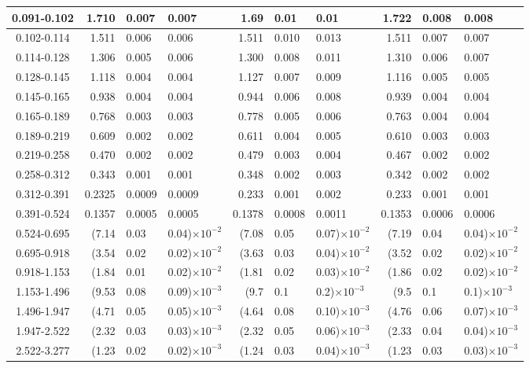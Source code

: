 \begin{table}[!htbp]
{\begin{tabular}{ | c | r@{$\pm$}l@{$\pm$}l | r@{$\pm$}l@{$\pm$}l |  r@{$\pm$}l@{$\pm$}l | }
0.091-0.102 & 1.710&0.007&0.007 & 1.69&0.01&0.01 & 1.722&0.008&0.008 \\ \hline
0.102-0.114 & 1.511&0.006&0.006 & 1.511&0.010&0.013 & 1.511&0.007&0.007 \\ \hline
0.114-0.128 & 1.306&0.005&0.006 & 1.300&0.008&0.011 & 1.310&0.006&0.007 \\ \hline
0.128-0.145 & 1.118&0.004&0.004 & 1.127&0.007&0.009 & 1.116&0.005&0.005 \\ \hline
0.145-0.165 & 0.938&0.004&0.004 & 0.944&0.006&0.008 & 0.939&0.004&0.004 \\ \hline
0.165-0.189 & 0.768&0.003&0.003 & 0.778&0.005&0.006 & 0.763&0.004&0.004 \\ \hline
0.189-0.219 & 0.609&0.002&0.002 & 0.611&0.004&0.005 & 0.610&0.003&0.003 \\ \hline
0.219-0.258 & 0.470&0.002&0.002 & 0.479&0.003&0.004 & 0.467&0.002&0.002 \\ \hline
0.258-0.312 & 0.343&0.001&0.001 & 0.348&0.002&0.003 & 0.342&0.002&0.002 \\ \hline
0.312-0.391 & 0.2325&0.0009&0.0009 & 0.233&0.001&0.002 & 0.233&0.001&0.001 \\ \hline
0.391-0.524 & 0.1357&0.0005&0.0005 & 0.1378&0.0008&0.0011 & 0.1353&0.0006&0.0006 \\ \hline
0.524-0.695 & (7.14&0.03&0.04)$\times 10^{-2}$ & (7.08&0.05&0.07)$\times 10^{-2}$ & (7.19&0.04&0.04)$\times 10^{-2}$ \\ \hline
0.695-0.918 & (3.54&0.02&0.02)$\times 10^{-2}$ & (3.63&0.03&0.04)$\times 10^{-2}$ & (3.52&0.02&0.02)$\times 10^{-2}$ \\ \hline
0.918-1.153 & (1.84&0.01&0.02)$\times 10^{-2}$ & (1.81&0.02&0.03)$\times 10^{-2}$ & (1.86&0.02&0.02)$\times 10^{-2}$ \\ \hline
1.153-1.496 & (9.53&0.08&0.09)$\times 10^{-3}$ & (9.7&0.1&0.2)$\times 10^{-3}$ & (9.5&0.1&0.1)$\times 10^{-3}$ \\ \hline
1.496-1.947 & (4.71&0.05&0.05)$\times 10^{-3}$ & (4.64&0.08&0.10)$\times 10^{-3}$ & (4.76&0.06&0.07)$\times 10^{-3}$ \\ \hline
1.947-2.522 & (2.32&0.03&0.03)$\times 10^{-3}$ & (2.32&0.05&0.06)$\times 10^{-3}$ & (2.33&0.04&0.04)$\times 10^{-3}$ \\ \hline
2.522-3.277 & (1.23&0.02&0.02)$\times 10^{-3}$ & (1.24&0.03&0.04)$\times 10^{-3}$ & (1.23&0.03&0.03)$\times 10^{-3}$ \\ \hline
\end{tabular}}
\end{table}
